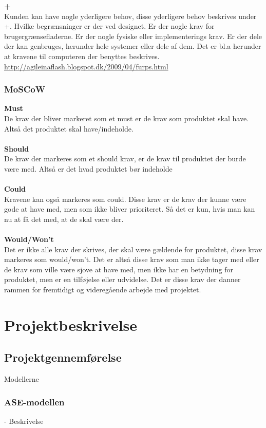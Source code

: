 \textbf{+}\\
Kunden kan have nogle yderligere behov, disse yderligere behov beskrives under +. Hvilke begrænsninger er der ved designet. Er der nogle krav for brugergrænsefladerne. Er der nogle fysiske eller implementerings krav. Er der dele der kan genbruges, herunder hele systemer eller dele af dem. Det er bl.a herunder at kravene til computeren der benyttes beskrives.\\
\url{http://agileinaflash.blogspot.dk/2009/04/furps.html}

\subsection{MoSCoW}
\textbf{Must}\\
De krav der bliver markeret som et must er de krav som produktet skal have. Altså det produktet skal have/indeholde.\\\\
\textbf{Should}\\
De krav der markeres som et should krav, er de krav til produktet der burde være med. Altså er det hvad produktet bør indeholde\\\\
\textbf{Could}\\
Kravene kan også markeres som could. Disse krav er de krav der kunne være gode at have med, men som ikke bliver prioriteret. Så det er kun, hvis man kan nu at få det med, at de skal være der.\\\\
\textbf{Would/Won't}\\
Det er ikke alle krav der skrives, der skal være gældende for produktet, disse krav markeres som would/won't. Det er altså disse krav som man ikke tager med eller de krav som ville være sjove at have med, men ikke har en betydning for produktet, men er en tilføjelse eller udvidelse. Det er disse krav der danner rammen for fremtidigt og videregående arbejde med projektet.
\chapter{Projektbeskrivelse}
\section{Projektgennemførelse}
Modellerne
\subsection{ASE-modellen}
- Beskrivelse
